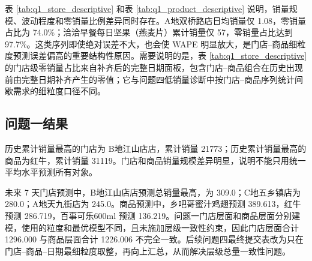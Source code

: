 表 \ref{tab:q1_store_descriptive} 和表 \ref{tab:q1_product_descriptive} 说明，销量规模、波动程度和零销量比例差异同时存在。A地双桥路店日均销量仅 1.08，零销量占比为 74.0\%；洽洽早餐每日坚果（燕麦片）累计销量仅 57，零销量占比达到 97.7\%。这类序列即使绝对误差不大，也会使 WAPE 明显放大，是门店--商品细粒度预测误差偏高的重要结构性原因。需要说明的是，表 \ref{tab:q1_store_descriptive} 的门店级零销量占比来自补齐后的完整日期面板，包含门店--商品组合在历史出现前由完整日期补齐产生的零值；它与问题四低销量诊断中按门店--商品序列统计间歇需求的细粒度口径不同。

\subsection{问题一结果}

历史累计销量最高的门店为 B地江山店店，累计销量 21773；历史累计销量最高的商品为红牛，累计销量 31119。门店和商品销量规模差异明显，说明不能只用统一平均水平预测所有对象。

未来 7 天门店预测中，B地江山店店预测总销量最高，为 309.0；C地五乡镇店为 280.0；A地天九街店为 245.0。商品预测中，乡吧哥蜜汁鸡翅预测 389.613，红牛预测 286.719，百事可乐600ml 预测 136.219。问题一门店层面和商品层面分别建模，使用的粒度和最优模型不同，且未施加层级一致性约束，因此门店层面合计 1296.000 与商品层面合计 1226.006 不完全一致。后续问题四最终提交表改为只在门店--商品--日期最细粒度取整，再向上汇总，从而解决层级总量一致性问题。
